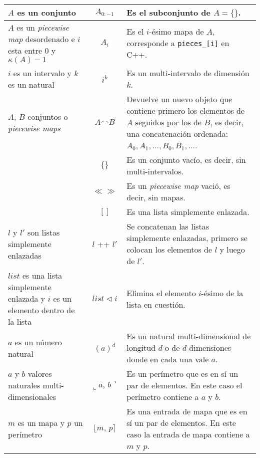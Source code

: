 \begin{table}[h]
{\begin{tabular}{|p{8cm}|c|p{12cm}|}
$A$ es un conjunto & $A_{0:-1}$ & Es el subconjunto de $A = \{\}$. \\ \hline


$A$ es un \textit{piecewise map} desordenado e $i$ esta entre 0 y $\kappa(A)-1$&  $A_i$& Es el $i$-ésimo mapa de $A$, corresponde a \texttt{pieces\_[i]} en C++.\\ \hline


$i$ es un intervalo y $k$ es un natural&  $i^k$& Es un multi-intervalo de dimensión $k$. \\ \hline

$A$, $B$ conjuntos o \textit{piecewise maps} & $A \frown B$ & Devuelve un nuevo objeto que contiene primero los elementos de $A$ seguidos por los de $B$, es decir, una concatenación ordenada: $A_0, A_1, \ldots, B_0, B_1, \ldots$. \\ \hline

&$\{\}$& Es un conjunto vacío, es decir, sin multi-intervalos. \\ \hline

&$\ll\gg$& Es un \textit{piecewise map} vació, es decir, sin mapas. \\ \hline

&$[]$& Es una lista simplemente enlazada. \\ \hline

$l$ y $l'$ son listas simplemente enlazadas&$l$ \!+\!+ $l'$& Se concatenan las listas simplemente enlazadas, primero se colocan los elementos de $l$ y luego de $l'$. \\ \hline

$list$ es una lista simplemente enlazada y $i$ es un elemento dentro de la lista &$list \triangleleft  i$& Elimina el elemento $i$-ésimo de la lista en cuestión. \\ \hline


$a$ es un número natural  & $(a)^d$ & Es un natural multi-dimensional de longitud $d$ o de $d$ dimensiones donde en cada una vale $a$. \\ \hline
$a$ y $b$ valores naturales multi-dimensionales & $\llcorner a,\,b\urcorner$ & Es un perímetro que es en sí un par de elementos. En este caso el perímetro contiene a $a$ y $b$. \\ \hline

$m$ es un mapa y $p$ un perímetro & $\lfloor m,\,p\rceil$ & Es una entrada de mapa que es en sí un par de elementos. En este caso la entrada de mapa contiene a $m$ y $p$. \\ \hline

\end{tabular}%
}
\end{table}


